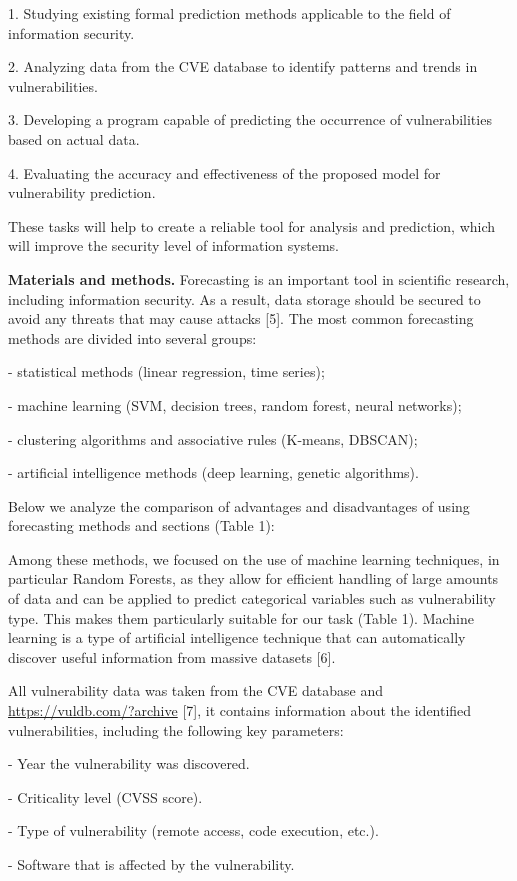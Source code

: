 \begin{multicols}{2}
1. Studying existing formal prediction methods applicable to the field
of information security.

2. Analyzing data from the CVE database to identify patterns and trends
in vulnerabilities.

3. Developing a program capable of predicting the occurrence of
vulnerabilities based on actual data.

4. Evaluating the accuracy and effectiveness of the proposed model for
vulnerability prediction.

These tasks will help to create a reliable tool for analysis and
prediction, which will improve the security level of information
systems.

{\bfseries Materials and methods.} Forecasting is an important tool in
scientific research, including information security. As a result, data
storage should be secured to avoid any threats that may cause attacks
{[}5{]}. The most common forecasting methods are divided into several
groups:

- statistical methods (linear regression, time series);

- machine learning (SVM, decision trees, random forest, neural
networks);

- clustering algorithms and associative rules (K-means, DBSCAN);

- artificial intelligence methods (deep learning, genetic algorithms).

Below we analyze the comparison of advantages and disadvantages of using
forecasting methods and sections (Table 1):

Among these methods, we focused on the use of machine learning
techniques, in particular Random Forests, as they allow for efficient
handling of large amounts of data and can be applied to predict
categorical variables such as vulnerability type. This makes them
particularly suitable for our task (Table 1). Machine learning is a type
of artificial intelligence technique that can automatically discover
useful information from massive datasets {[}6{]}.

All vulnerability data was taken from the CVE database and
\url{https://vuldb.com/?archive} {[}7{]}, it contains information about
the identified vulnerabilities, including the following key parameters:

- Year the vulnerability was discovered.

- Criticality level (CVSS score).

- Type of vulnerability (remote access, code execution, etc.).

- Software that is affected by the vulnerability.
\end{multicols}
